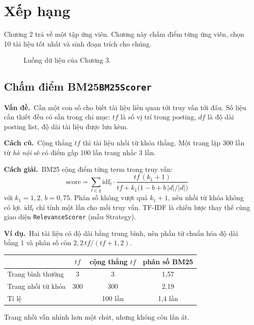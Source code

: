 \documentclass[9pt,twocolumn,a4paper]{extarticle}
\newcommand{\code}[1]{\texttt{#1}}
\newcommand{\dsa}[2]{\subsection[#1]{#1\hfill{\normalfont\footnotesize\code{#2}}}}
\newcommand{\vande}{\textcolor{linkblue}{\textbf{Vấn đề.}}~}
\newcommand{\cachgiai}{\textcolor{linkblue}{\textbf{Cách giải.}}~}
\newcommand{\cu}{\textcolor{linkblue}{\textbf{Cách cũ.}}~}
\newcommand{\vidu}{\textcolor{linkblue}{\textbf{Ví dụ.}}~}
\begin{document}
\section{Xếp hạng}
\label{sec:rank}
Chương 2 trả về một tập ứng viên. Chương này chấm điểm từng ứng viên, chọn 10 tài liệu tốt nhất và sinh đoạn trích cho chúng.

\begin{figure}[H]
\centering
{}
\caption{Luồng dữ liệu của Chương 3.}
\label{fig:pipe3}
\end{figure}

\dsa{Chấm điểm BM25}{BM25Scorer}
\vande Cần một con số cho biết tài liệu liên quan tới truy vấn tới đâu. Số liệu cần thiết đều có sẵn trong chỉ mục: $tf$ là số vị trí trong posting, $df$ là độ dài posting list, độ dài tài liệu được lưu kèm.

\cu Cộng thẳng $tf$ thì tài liệu nhồi từ khóa thắng. Một trang lặp 300 lần từ \emph{hà nội} sẽ có điểm gấp 100 lần trang nhắc 3 lần.

\cachgiai BM25 \cite{robertson2009bm25} cộng điểm từng term trong truy vấn:
\begin{equation}
\text{score}=\sum_{t\in q}\text{idf}_t\cdot
\frac{tf\,(k_1+1)}{tf+k_1\big(1-b+b\,|d|/\overline{|d|}\big)}
\label{eq:bm25}
\end{equation}
với $k_1=1{,}2$, $b=0{,}75$. Phân số không vượt quá $k_1+1$, nên nhồi từ khóa không có lợi. $\text{idf}_t$ chỉ tính một lần cho mỗi truy vấn. TF-IDF là chiến lược thay thế cùng giao diện \code{RelevanceScorer} (mẫu Strategy).

\vidu Hai tài liệu có độ dài bằng trung bình, nên phần tử chuẩn hóa độ dài bằng 1 và phân số còn $2{,}2\,tf/(tf+1{,}2)$.
\begin{center}\footnotesize
\begin{tabular}{@{}lccc@{}}
\toprule
& $tf$ & cộng thẳng $tf$ & phân số BM25 \\
\midrule
Trang bình thường & 3 & 3 & 1,57 \\
Trang nhồi từ khóa & 300 & 300 & 2,19 \\
Tỉ lệ & & 100 lần & 1,4 lần \\
\bottomrule
\end{tabular}
\end{center}
Trang nhồi vẫn nhỉnh hơn một chút, nhưng không còn lấn át.
\end{document}
